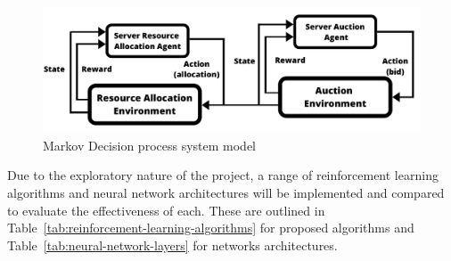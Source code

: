 \begin{figure}[H]
    \centering
    \includegraphics[width=14cm]{figures/3_solution_figs/flexible_resource_allocation_env.pdf}
    \caption{Markov Decision process system model}
    \label{fig:mdp-system-model}
\end{figure}

Due to the exploratory nature of the project, a range of reinforcement learning algorithms and neural network
architectures will be implemented and compared to evaluate the effectiveness of each. These are outlined in
Table~\ref{tab:reinforcement-learning-algorithms} for proposed algorithms and Table~\ref{tab:neural-network-layers} for
networks architectures.

